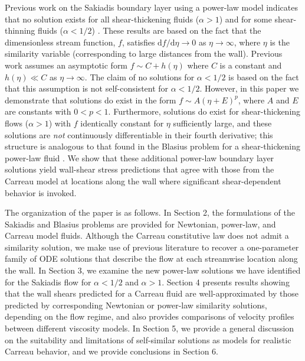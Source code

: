 \documentclass{article}
\begin{document}
Previous work on the Sakiadis boundary layer using a power-law model indicates that no solution exists for all shear-thickening fluids ($\alpha > 1$) and for some shear-thinning fluids ($\alpha < 1/2$) \cite{Fox, NonNewtonian}. These results are based on the fact that the dimensionless stream function, $f$, satisfies $\text{d}f/\text{d}\eta \to 0$ as $\eta \to \infty$, where $\eta$ is the similarity variable (corresponding to large distances from the wall). Previous work assumes an asymptotic form $f \sim C + h(\eta)$ where $C$ is a constant and $h(\eta) \ll C$ as $\eta \to \infty$. The claim of no solutions for $\alpha < 1/2$ is based on the fact that this assumption is not self-consistent for $\alpha < 1/2$.  However, in this paper we demonstrate that solutions do exist in the form $f \sim A(\eta + E)^p$, where $A$ and $E$ are constants with $0<p<1$.  Furthermore, solutions do exist for shear-thickening flows ($\alpha > 1$) with $f$ identically constant for $\eta$ sufficiently large, and these solutions are \textit{not} continuously differentiable in their fourth derivative; this structure is analogous to that found in the Blasius problem for a shear-thickening power-law fluid \cite{Zhizhin1978-us, Pavlov1982-qh}. We show that these additional power-law boundary layer solutions yield wall-shear stress predictions that agree with those from the Carreau model at locations along the wall where significant shear-dependent behavior is invoked.

The organization of the paper is as follows. In Section 2, the formulations of the Sakiadis and Blasius problems are provided for Newtonian, power-law, and Carreau model fluids. Although the Carreau constitutive law does not admit a similarity solution, we make use of previous literature \cite{Griffiths} to recover a one-parameter family of ODE solutions that describe the flow at each streamwise location along the wall. In Section 3, we examine the new power-law solutions we have identified for the Sakiadis flow for $\alpha < 1/2$ and $\alpha > 1$. Section 4 presents results showing that the wall shears predicted for a Carreau fluid are well-approximated by those predicted by corresponding Newtonian or power-law similarity solutions, depending on the flow regime, and also provides comparisons of velocity profiles between different viscosity models.  In Section 5, we provide a general discussion on the suitability and limitations of self-similar solutions as models for realistic Carreau behavior, and we provide conclusions in Section 6.
\end{document}
